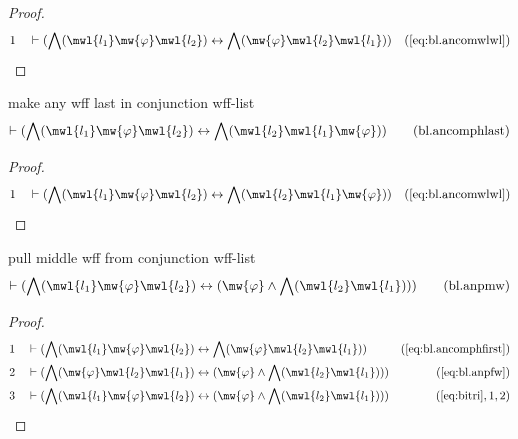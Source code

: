 \begin{proof}
\begin{align}
  1 &&  & \vdash ( \bigwedge( \mwl{l_1} \mw{\varphi} \mwl{l_2} ) \leftrightarrow \bigwedge( \mw{\varphi} \mwl{l_2} \mwl{l_1} ) )&(\mbox{\ref{eq:bl.ancomwlwl}})\notag
\end{align}
\end{proof}

\begin{lemma} make any wff last in conjunction
wff-list
\begin{align}
\vdash ( \bigwedge( \mwl{l_1} \mw{\varphi} \mwl{l_2} ) \leftrightarrow
    \bigwedge( \mwl{l_2} \mwl{l_1} \mw{\varphi} )
    )\label{eq:bl.ancomphlast}\tag{bl.ancomphlast}
\end{align}
\end{lemma}

\begin{proof}
\begin{align}
  1 &&  & \vdash ( \bigwedge( \mwl{l_1} \mw{\varphi} \mwl{l_2} ) \leftrightarrow \bigwedge( \mwl{l_2} \mwl{l_1} \mw{\varphi} ) )&(\mbox{\ref{eq:bl.ancomwlwl}})\notag
\end{align}
\end{proof}

\begin{lemma} pull middle wff from conjunction wff-list
\begin{align}
\vdash ( \bigwedge( \mwl{l_1} \mw{\varphi} \mwl{l_2} ) \leftrightarrow (
    \mw{\varphi} \wedge \bigwedge( \mwl{l_2} \mwl{l_1} ) )
    )\label{eq:bl.anpmw}\tag{bl.anpmw}
\end{align}
\end{lemma}

\begin{proof}
\begin{align}
  1 &&  & \vdash ( \bigwedge( \mwl{l_1} \mw{\varphi} \mwl{l_2} ) \leftrightarrow \bigwedge( \mw{\varphi} \mwl{l_2} \mwl{l_1} ) )&(\mbox{\ref{eq:bl.ancomphfirst}})\notag
  \\ 2 &&  & \vdash ( \bigwedge( \mw{\varphi} \mwl{l_2} \mwl{l_1} ) \leftrightarrow ( \mw{\varphi} \wedge \bigwedge( \mwl{l_2} \mwl{l_1} ) ) )&(\mbox{\ref{eq:bl.anpfw}})\notag
  \\ 3 &&  & \vdash ( \bigwedge( \mwl{l_1} \mw{\varphi} \mwl{l_2} ) \leftrightarrow ( \mw{\varphi} \wedge \bigwedge( \mwl{l_2} \mwl{l_1} ) ) )&(\mbox{\ref{eq:bitri}},1,2)\notag
\end{align}
\end{proof}


